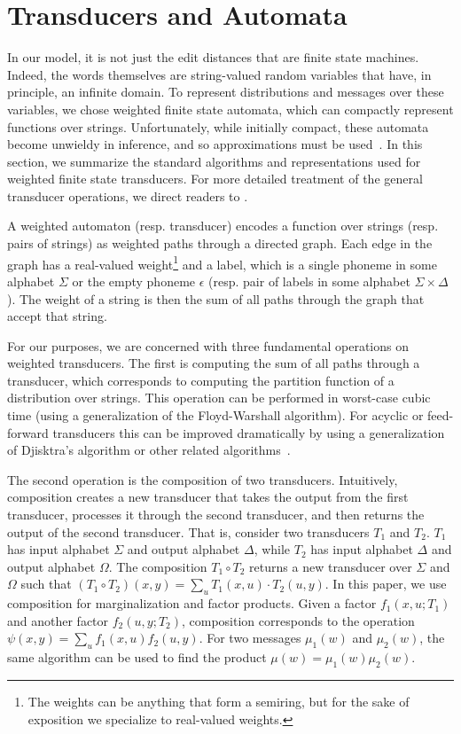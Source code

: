 \documentclass[11pt,a4paper]{article}
\begin{document}
\section{Transducers and Automata}

In our model, it is not just the edit distances that are finite
state machines. Indeed, the words themselves are string-valued
random variables that have, in principle, an infinite domain. To
represent distributions and messages over these variables, we chose
weighted finite state automata, which can compactly represent
functions over strings. Unfortunately, while initially compact,
these automata become unwieldy in inference, and so approximations
must be used~\cite{dreyer2009graphical}.  In this section, we
summarize the standard algorithms and representations used for
weighted finite state transducers. For more detailed treatment of
the general transducer operations, we direct readers to
.

A weighted automaton (resp. transducer) encodes a function over
strings (resp. pairs of strings) as weighted paths through a directed
graph. Each edge in the graph has a real-valued weight\footnote{The
weights can be anything that form a semiring, but for the sake of
exposition we specialize to real-valued weights.} and a label, which
is a single phoneme in some alphabet $\Sigma$ or the empty phoneme
$\epsilon$ (resp. pair of labels in some alphabet $\Sigma \times
\Delta$). The weight of a string is then the sum of all paths through
the graph that accept that string.

For our purposes, we are concerned with three fundamental operations
on weighted transducers. The first is computing the sum of all paths
through a transducer, which corresponds to computing the partition
function of a distribution over strings. This operation can be
performed in worst-case cubic time (using a generalization of the
Floyd-Warshall algorithm).  For acyclic or feed-forward transducers
this can be improved dramatically by using a generalization of
Djisktra's algorithm or other related algorithms~\cite{mohri09weighted}.

The second operation is the composition of two transducers.
Intuitively, composition creates a new transducer that takes the
output from the first transducer, processes it through the second
transducer, and then returns the output of the second transducer.
That is, consider two transducers $T_1$ and $T_2$. $T_1$ has input
alphabet $\Sigma$ and output alphabet $\Delta$, while $T_2$ has
input alphabet $\Delta$ and output alphabet $\Omega$. The composition
$T_1 \circ T_2$ returns a new transducer over $\Sigma$ and $\Omega$
such that $(T_1 \circ T_2)(x,y) = \sum_{u} T_1(x,u)\cdot T_2(u,y)$.
In this paper, we use composition for marginalization and factor
products. Given a factor $f_1(x,u;T_1)$ and another factor $f_2(u,y;T_2)$,
composition corresponds to the operation $\psi(x,y) = \sum_u f_1(x,u)
f_2(u,y)$. For two messages $\mu_1(w)$ and $\mu_2(w)$, the same
algorithm can be used to find the product $\mu(w) = \mu_1(w)\mu_2(w)$.
\end{document}
